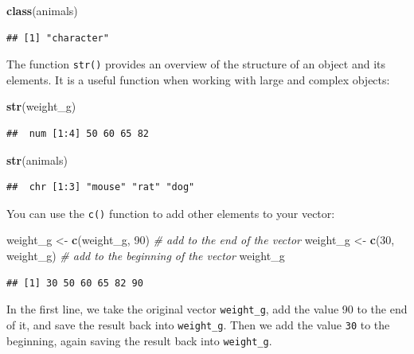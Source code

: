 \documentclass[]{book}
\newenvironment{Shaded}{\begin{snugshade}}{\end{snugshade}}
\newcommand{\CommentTok}[1]{\textcolor[rgb]{0.56,0.35,0.01}{\textit{#1}}}
\newcommand{\DecValTok}[1]{\textcolor[rgb]{0.00,0.00,0.81}{#1}}
\newcommand{\KeywordTok}[1]{\textcolor[rgb]{0.13,0.29,0.53}{\textbf{#1}}}
\newcommand{\NormalTok}[1]{#1}
\newcommand{\StringTok}[1]{\textcolor[rgb]{0.31,0.60,0.02}{#1}}
\begin{document}
\begin{Shaded}
\begin{Highlighting}[]
\KeywordTok{class}\NormalTok{(animals)}
\end{Highlighting}
\end{Shaded}

\begin{verbatim}
## [1] "character"
\end{verbatim}

The function \texttt{str()} provides an overview of the structure of an object and its elements. It is a useful function when working with large and complex objects:

\begin{Shaded}
\begin{Highlighting}[]
\KeywordTok{str}\NormalTok{(weight_g)}
\end{Highlighting}
\end{Shaded}

\begin{verbatim}
##  num [1:4] 50 60 65 82
\end{verbatim}

\begin{Shaded}
\begin{Highlighting}[]
\KeywordTok{str}\NormalTok{(animals)}
\end{Highlighting}
\end{Shaded}

\begin{verbatim}
##  chr [1:3] "mouse" "rat" "dog"
\end{verbatim}

You can use the \texttt{c()} function to add other elements to your vector:

\begin{Shaded}
\begin{Highlighting}[]
\NormalTok{weight_g <-}\StringTok{ }\KeywordTok{c}\NormalTok{(weight_g, }\DecValTok{90}\NormalTok{) }\CommentTok{# add to the end of the vector}
\NormalTok{weight_g <-}\StringTok{ }\KeywordTok{c}\NormalTok{(}\DecValTok{30}\NormalTok{, weight_g) }\CommentTok{# add to the beginning of the vector}
\NormalTok{weight_g}
\end{Highlighting}
\end{Shaded}

\begin{verbatim}
## [1] 30 50 60 65 82 90
\end{verbatim}

In the first line, we take the original vector \texttt{weight\_g}, add the value 90 to the end of it, and save the result back into \texttt{weight\_g}. Then we add the value \texttt{30} to the beginning, again saving the result back into \texttt{weight\_g}.
\end{document}
